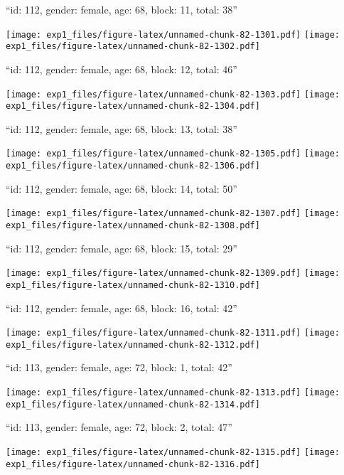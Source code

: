 \documentclass[11pt,,]{article}
\begin{document}
\newpage
[1] 

``id: 112, gender: female, age: 68, block: 11, total: 38''

\texttt{[image: exp1\_files/figure-latex/unnamed-chunk-82-1301.pdf]}
\texttt{[image: exp1\_files/figure-latex/unnamed-chunk-82-1302.pdf]}

\newpage
[1] 

``id: 112, gender: female, age: 68, block: 12, total: 46''

\texttt{[image: exp1\_files/figure-latex/unnamed-chunk-82-1303.pdf]}
\texttt{[image: exp1\_files/figure-latex/unnamed-chunk-82-1304.pdf]}

\newpage
[1] 

``id: 112, gender: female, age: 68, block: 13, total: 38''

\texttt{[image: exp1\_files/figure-latex/unnamed-chunk-82-1305.pdf]}
\texttt{[image: exp1\_files/figure-latex/unnamed-chunk-82-1306.pdf]}

\newpage
[1] 

``id: 112, gender: female, age: 68, block: 14, total: 50''

\texttt{[image: exp1\_files/figure-latex/unnamed-chunk-82-1307.pdf]}
\texttt{[image: exp1\_files/figure-latex/unnamed-chunk-82-1308.pdf]}

\newpage
[1] 

``id: 112, gender: female, age: 68, block: 15, total: 29''

\texttt{[image: exp1\_files/figure-latex/unnamed-chunk-82-1309.pdf]}
\texttt{[image: exp1\_files/figure-latex/unnamed-chunk-82-1310.pdf]}

\newpage
[1] 

``id: 112, gender: female, age: 68, block: 16, total: 42''

\texttt{[image: exp1\_files/figure-latex/unnamed-chunk-82-1311.pdf]}
\texttt{[image: exp1\_files/figure-latex/unnamed-chunk-82-1312.pdf]}

\newpage
[1] 

``id: 113, gender: female, age: 72, block: 1, total: 42''

\texttt{[image: exp1\_files/figure-latex/unnamed-chunk-82-1313.pdf]}
\texttt{[image: exp1\_files/figure-latex/unnamed-chunk-82-1314.pdf]}

\newpage
[1] 

``id: 113, gender: female, age: 72, block: 2, total: 47''

\texttt{[image: exp1\_files/figure-latex/unnamed-chunk-82-1315.pdf]}
\texttt{[image: exp1\_files/figure-latex/unnamed-chunk-82-1316.pdf]}
\end{document}
